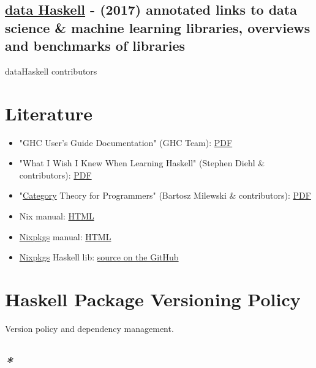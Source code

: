 \documentclass[a4paper,14pt,oneside]{book}
\begin{document}
\section{\href{http://www.datahaskell.org/docs}{data Haskell} - (2017) annotated links to data science \& machine learning libraries, overviews and benchmarks of libraries}
\label{sec:org3d77a9c}
dataHaskell contributors

\chapter{Literature}
\label{sec:org75392f4}

\begin{itemize}
\item "GHC User’s Guide Documentation" (GHC Team): \href{https://downloads.haskell.org/\~ghc/latest/docs/users\_guide.pdf}{PDF}
\item "What I Wish I Knew When Learning Haskell" (Stephen Diehl \& contributors): \href{http://dev.stephendiehl.com/hask/tutorial.pdf}{PDF}
\item "\hyperref[orgf8e0196]{Category} Theory for Programmers" (Bartosz Milewski \& contributors): \href{https://s3.amazonaws.com/milewski-ctfp-pdf/category-theory-for-programmers.pdf}{PDF}
\item Nix manual: \href{https://nixos.org/nix/manual/}{HTML}
\item \hyperref[orge51fb0b]{Nixpkgs} manual: \href{https://nixos.org/nixpkgs/manual/}{HTML}
\item \hyperref[orge51fb0b]{Nixpkgs} Haskell lib: \href{https://github.com/NixOS/nixpkgs/blob/master/pkgs/development/haskell-modules/lib.nix}{source on the GitHub}
\end{itemize}

\chapter{\label{org1ed5df5}Haskell Package Versioning Policy}
\label{sec:org9338e6c}

Version policy and dependency management.

\begin{center}

\end{center}

\section{\emph{*}}
\label{sec:org5118b7e}
\end{document}
